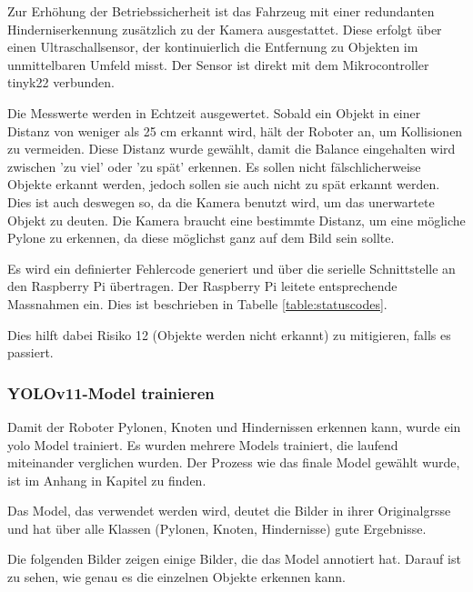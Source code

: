 Zur Erhöhung der Betriebssicherheit ist das Fahrzeug mit einer redundanten Hinderniserkennung zusätzlich zu der Kamera ausgestattet. Diese erfolgt über einen Ultraschallsensor, der kontinuierlich die Entfernung zu Objekten im unmittelbaren Umfeld misst. Der Sensor ist direkt mit dem Mikrocontroller \gls{tinyk22} verbunden.

Die Messwerte werden in Echtzeit ausgewertet. Sobald ein Objekt in einer Distanz von weniger als 25 cm erkannt wird, hält der Roboter an, um Kollisionen zu vermeiden. Diese Distanz wurde gewählt, damit die Balance eingehalten wird zwischen 'zu viel' oder 'zu spät' erkennen. Es sollen nicht fälschlicherweise Objekte erkannt werden, jedoch sollen sie auch nicht zu spät erkannt werden. Dies ist auch deswegen so, da die Kamera benutzt wird, um das unerwartete Objekt zu deuten. Die Kamera braucht eine bestimmte Distanz, um eine mögliche Pylone zu erkennen, da diese möglichst ganz auf dem Bild sein sollte.

Es wird ein definierter Fehlercode generiert und über die serielle Schnittstelle an den Raspberry Pi übertragen. Der Raspberry Pi leitete entsprechende Massnahmen ein. Dies ist beschrieben in Tabelle \ref{table:statuscodes}.

Dies hilft dabei Risiko 12 (Objekte werden nicht erkannt) zu mitigieren, falls es passiert.



\subsubsection{YOLOv11-Model trainieren}

Damit der Roboter Pylonen, Knoten und Hindernissen erkennen kann, wurde ein \gls{yolo} Model trainiert.
Es wurden mehrere Models trainiert, die laufend miteinander verglichen wurden. Der Prozess wie das finale Model gewählt wurde, ist im Anhang in Kapitel  zu finden.

Das Model, das verwendet werden wird, deutet die Bilder in ihrer Originalgrsse und hat über alle Klassen (Pylonen, Knoten, Hindernisse) gute Ergebnisse.

Die folgenden Bilder zeigen einige Bilder, die das Model annotiert hat. Darauf ist zu sehen, wie genau es die einzelnen Objekte erkennen kann.

